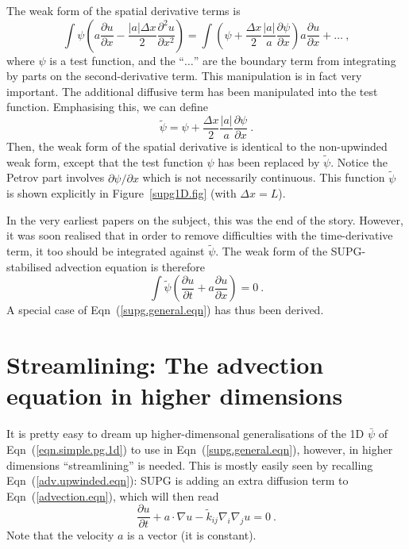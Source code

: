 \documentclass[]{scrreprt}
\begin{document}
The weak form of the spatial derivative terms is
\begin{equation}
\int \psi \left(a\frac{\partial u}{\partial x} -
\frac{|a|\Delta x}{2} \frac{\partial^{2} u}{\partial x^{2}}\right)
 = \int \left( \psi + \frac{\Delta x}{2}\frac{|a|}{a}\frac{\partial
   \psi}{\partial x} \right) a\frac{\partial u}{\partial x} + \ldots \ ,
\end{equation}
where $\psi$ is a test function, and the ``$\ldots$'' are the boundary
term from integrating by parts on the second-derivative term.  This
manipulation is in fact very important.  The additional diffusive term
has been manipulated into the test function.  Emphasising this, we can
define
\begin{equation}
\tilde{\psi} = \psi + \frac{\Delta x}{2}\frac{|a|}{a}\frac{\partial
   \psi}{\partial x} \ .
\label{eqn.simple.pg.1d}
\end{equation}
Then, the weak form of the spatial derivative is identical to the
non-upwinded weak form, except that the test function $\psi$ has been
replaced by $\tilde{\psi}$.  Notice the Petrov part involves
$\partial\psi/\partial x$ which is not necessarily continuous.  This
function $\tilde{\psi}$ is shown explicitly in Figure~\ref{supg1D.fig}
(with $\Delta x = L$).

In the very earliest papers on the subject, this was the end of the
story.  However, it was soon realised that in order to remove
difficulties with the time-derivative term, it too should be
integrated against $\tilde{\psi}$.  The weak form of the
SUPG-stabilised advection equation is therefore
\begin{equation}
\int \tilde{\psi} \left(\frac{\partial u}{\partial t} +
a\frac{\partial u}{\partial x}\right) = 0\ .
\end{equation}
A special case of Eqn~(\ref{supg.general.eqn}) has thus been derived.


\section{Streamlining: The advection equation in higher dimensions}

It is pretty easy to dream up higher-dimensonal generalisations of the
1D $\bar{\psi}$ of Eqn~(\ref{eqn.simple.pg.1d}) to use in
Eqn~(\ref{supg.general.eqn}), however, in higher dimensions
``streamlining'' is needed.  This is mostly easily seen by recalling
Eqn~(\ref{adv.upwinded.eqn}): SUPG is adding an extra diffusion term
to Eqn~(\ref{advection.eqn}), which will then read
\begin{equation}
\frac{\partial u}{\partial t} + a\cdot\nabla u -
\tilde{k}_{ij}\nabla_{i}\nabla_{j}u = 0 \ .
\label{eqn.multidim.advect}
\end{equation}
Note that the velocity $a$ is a vector (it is constant).
\end{document}
